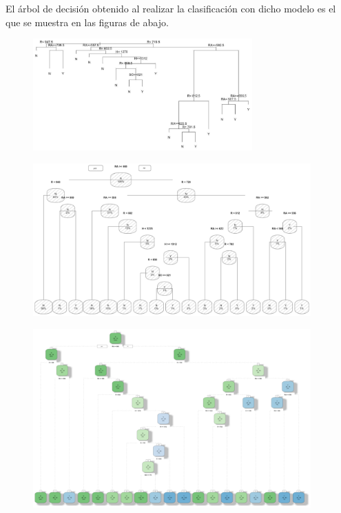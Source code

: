 \documentclass[10pt]{article}
\begin{document}
El árbol de decisión obtenido al realizar la clasificación con dicho modelo es el que se muestra en las figuras de abajo.

\begin{figure}[H]
	\begin{center}
 		\includegraphics[width = 0.75\textwidth]{Imagenes/arbol1.eps}
	\end{center} 
\end{figure}

\begin{figure}[H]
	\begin{center}
 		\includegraphics[width = 0.95\textwidth]{Imagenes/arbol2.eps}
	\end{center} 
\end{figure}

\begin{figure}[H]
	\begin{center}
 		\includegraphics[width = 0.95\textwidth]{Imagenes/arbol3.eps}
	\end{center} 
\end{figure}
\end{document}
